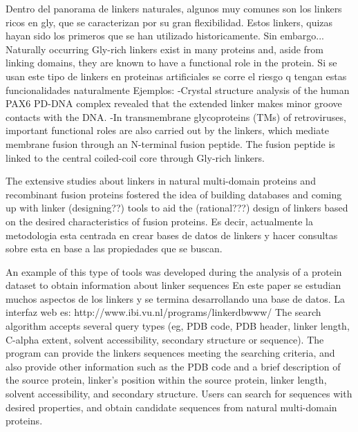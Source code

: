 Dentro del panorama de linkers naturales, algunos muy comunes son los linkers ricos en gly, que se caracterizan por su gran flexibilidad.
Estos linkers, quizas hayan sido los primeros que se han utilizado historicamente.
Sin embargo...
Naturally occurring Gly-rich linkers exist in many proteins and, aside from linking domains, they are known to have a functional role in the protein. 
Si se usan este tipo de linkers en proteinas artificiales se corre el riesgo q tengan estas funcionalidades naturalmente
Ejemplos: 
-Crystal structure analysis of the human PAX6 PD-DNA complex revealed that the extended linker makes minor groove contacts with the DNA. 
-In transmembrane glycoproteins (TMs) of retroviruses, important functional roles are also carried out by the linkers, which mediate membrane fusion through an N-terminal
fusion peptide. The fusion peptide is linked to the central coiled-coil core through Gly-rich linkers.


The extensive studies about linkers in natural multi-domain proteins and recombinant fusion proteins fostered the idea of building databases and coming up with linker (designing??) tools 
to aid the (rational???) design of linkers based on the desired characteristics of fusion proteins.
Es decir, actualmente la metodologia esta centrada en crear bases de datos de linkers y hacer consultas sobre esta en base a las propiedades que se buscan.

An example of this type of tools was developed during the analysis of a protein dataset to obtain information about linker sequences \cite{george2002analysis}
En este paper se estudian muchos aspectos de los linkers y se termina desarrollando una base de datos. La interfaz web es: http://www.ibi.vu.nl/programs/linkerdbwww/
The search algorithm accepts several query types (eg, PDB code, PDB header, linker length, C-alpha extent, solvent accessibility, secondary structure or sequence). 
The program can provide the linkers sequences meeting the searching criteria, and also provide other
information such as the PDB code and a brief description of the source protein, linker’s
position within the source protein, linker length, solvent accessibility, and secondary
structure. Users can search for sequences with desired properties, and obtain candidate
sequences from natural multi-domain proteins.




